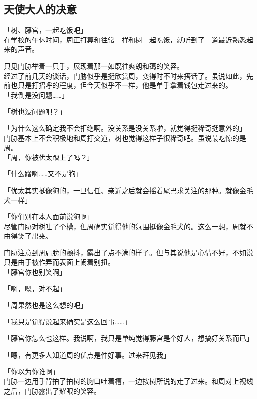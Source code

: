 \subsection{天使大人的决意}

「树、藤宫，一起吃饭吧」\\

在学校的午休时间，周正打算和往常一样和树一起吃饭，就听到了一道最近熟悉起来的声音。

只见门胁举着一只手，展现着那一如既往爽朗和蔼的笑容。\\

经过了前几天的谈话，门胁似乎是挺欣赏周，变得时不时来搭话了。虽说如此，先前也只是打招呼的程度，但今天似乎不一样，他是单手拿着钱包走过来的。\\

「我倒是没问题……」

「树也没问题吧？」

「为什么这么确定我不会拒绝啊。没关系是没关系啦，就觉得挺稀奇挺意外的」\\

门胁基本上不会积极地和周打交道，树也觉得这样子很稀奇吧。虽说最吃惊的是周。\\

「周，你被优太蹭上了吗？」

「什么蹭啊……又不是狗」

「优太其实挺像狗的，一旦信任、亲近之后就会摇着尾巴求关注的那种。就像金毛犬一样」

「你们别在本人面前说狗啊」\\

尽管门胁对树吐了个槽，但周确实觉得他的氛围挺像金毛犬的。这么一想，周就不由得笑了出来。

门胁注意到周肩膀的颤抖，露出了点不满的样子。但与其说他是心情不好，不如说只是由于被作弄而表面上闹着别扭。\\

「藤宫你也别笑啊」

「啊，嗯，对不起」

「周果然也是这么想的吧」

「我只是觉得说起来确实是这么回事……」

「藤宫你怎么也这样。我说啊，我只是单纯觉得藤宫是个好人，想搞好关系而已」

「嗯，有更多人知道周的优点是件好事。过来拜见我」

「你以为你谁啊」\\

门胁一边用手背拍了拍树的胸口吐着槽，一边按树所说的走了过来。和周对上视线之后，门胁露出了耀眼的笑容。

